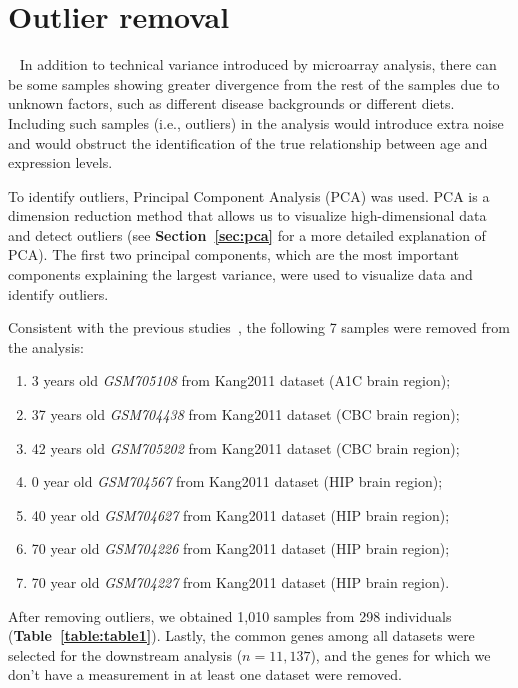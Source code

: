 \section{Outlier removal}~\label{sec:out.rm}
In addition to technical variance introduced by microarray analysis, 
there can be some samples showing greater divergence from the rest of the samples due to unknown factors,
such as different disease backgrounds or different diets.
Including such samples (i.e., outliers) in the analysis would introduce extra noise and would obstruct the identification of the true relationship between age and expression levels.

To identify outliers, Principal Component Analysis (PCA) was used. 
PCA is a dimension reduction method that allows us to visualize high-dimensional data and detect outliers (see \textbf{Section~\ref{sec:pca}} for a more detailed explanation of PCA).
The first two principal components, which are the most important components explaining the largest variance, were used to visualize data and identify outliers.

Consistent with the previous studies~\cite{Donertas2017,Donertas2018}, the following 7 samples were removed from the analysis: 
\begin{enumerate}
    \item 3 years old \textit{GSM705108} from Kang2011 dataset (A1C brain region);
    \item 37 years old \textit{GSM704438} from Kang2011 dataset (CBC brain region);
    \item 42 years old \textit{GSM705202} from Kang2011 dataset (CBC brain region);
    \item 0 year old \textit{GSM704567} from Kang2011 dataset (HIP brain region);
    \item 40 year old \textit{GSM704627} from Kang2011 dataset (HIP brain region);
    \item 70 year old \textit{GSM704226} from Kang2011 dataset (HIP brain region);
    \item 70 year old \textit{GSM704227} from Kang2011 dataset (HIP brain region).
\end{enumerate}

After removing outliers, we obtained 1,010 samples from 298 individuals (\textbf{Table~\ref{table:table1}}).
Lastly, the common genes among all datasets were selected for the downstream analysis ($n=11,137$), 
and the genes for which we don't have a measurement in at least one dataset were removed.

